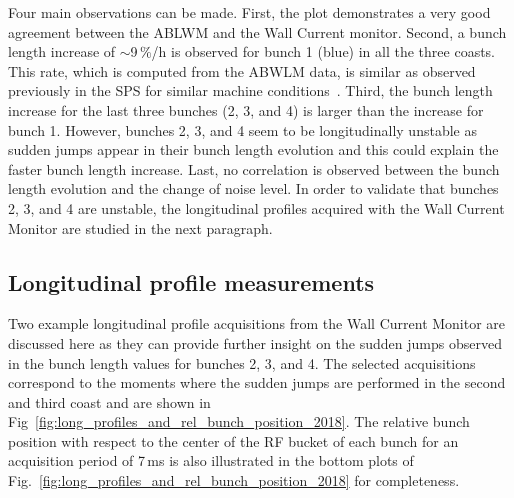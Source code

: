 Four main observations can be made. First, the plot demonstrates a very good agreement between the ABLWM and the Wall Current monitor. Second, a bunch length increase of $\sim$9\,$\%$/h is observed for bunch 1 (blue) in all the three coasts. This rate, which is computed from the ABWLM data, is similar as observed previously in the SPS for similar machine conditions~\cite{Alekou_CC_coast_prep_2016}. Third, the bunch length increase for the last three bunches (2, 3, and 4) is larger than the increase for bunch 1. However, bunches 2, 3, and 4 seem to be longitudinally unstable as sudden jumps appear in their bunch length evolution and this could explain the faster bunch length increase. Last, no correlation is observed between the bunch length evolution and the change of noise level. In order to validate that bunches 2, 3, and 4 are unstable, the longitudinal profiles acquired with the Wall Current Monitor are studied in the next paragraph. 

\subsection{Longitudinal profile measurements}\label{subsec:long_profiles_meas_2018}
Two example longitudinal profile acquisitions from the Wall Current Monitor are discussed here as they can provide further insight on the sudden jumps observed in the bunch length values for bunches 2, 3, and 4. The selected acquisitions correspond to the moments where the sudden jumps are performed in the second and third coast and are shown in Fig~\ref{fig:long_profiles_and_rel_bunch_position_2018}. The relative bunch position with respect to the center of the RF bucket of each bunch for an acquisition period of 7\,ms is also illustrated in the bottom plots of Fig.~\ref{fig:long_profiles_and_rel_bunch_position_2018} for completeness. 


